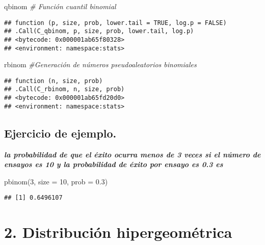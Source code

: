 \documentclass[
]{article}
\newenvironment{Shaded}{\begin{snugshade}}{\end{snugshade}}
\newcommand{\AttributeTok}[1]{\textcolor[rgb]{0.77,0.63,0.00}{#1}}
\newcommand{\CommentTok}[1]{\textcolor[rgb]{0.56,0.35,0.01}{\textit{#1}}}
\newcommand{\DecValTok}[1]{\textcolor[rgb]{0.00,0.00,0.81}{#1}}
\newcommand{\FloatTok}[1]{\textcolor[rgb]{0.00,0.00,0.81}{#1}}
\newcommand{\FunctionTok}[1]{\textcolor[rgb]{0.00,0.00,0.00}{#1}}
\newcommand{\NormalTok}[1]{#1}
\begin{document}
\begin{Shaded}
\begin{Highlighting}[]
\NormalTok{qbinom }\CommentTok{\#    Función cuantil binomial}
\end{Highlighting}
\end{Shaded}

\begin{verbatim}
## function (p, size, prob, lower.tail = TRUE, log.p = FALSE) 
## .Call(C_qbinom, p, size, prob, lower.tail, log.p)
## <bytecode: 0x000001ab65f80328>
## <environment: namespace:stats>
\end{verbatim}

\begin{Shaded}
\begin{Highlighting}[]
\NormalTok{rbinom  }\CommentTok{\#Generación de números pseudoaleatorios binomiales}
\end{Highlighting}
\end{Shaded}

\begin{verbatim}
## function (n, size, prob) 
## .Call(C_rbinom, n, size, prob)
## <bytecode: 0x000001ab65fd20d0>
## <environment: namespace:stats>
\end{verbatim}

\hypertarget{ejercicio-de-ejemplo.}{%
\subsection{Ejercicio de ejemplo.}\label{ejercicio-de-ejemplo.}}

\textbf{\emph{la probabilidad de que el éxito ocurra menos de 3 veces si
el número de ensayos es 10 y la probabilidad de éxito por ensayo es 0.3
es}}

\begin{Shaded}
\begin{Highlighting}[]
\FunctionTok{pbinom}\NormalTok{(}\DecValTok{3}\NormalTok{, }\AttributeTok{size =} \DecValTok{10}\NormalTok{, }\AttributeTok{prob =} \FloatTok{0.3}\NormalTok{)}
\end{Highlighting}
\end{Shaded}

\begin{verbatim}
## [1] 0.6496107
\end{verbatim}

\hypertarget{distribuciuxf3n-hipergeomuxe9trica}{%
\section{2. Distribución
hipergeométrica}\label{distribuciuxf3n-hipergeomuxe9trica}}
\end{document}
